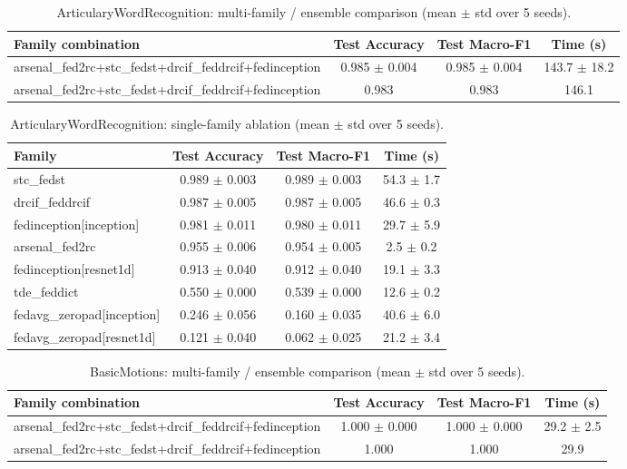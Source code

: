 \begin{table}[t]
\centering
\caption{ArticularyWordRecognition: multi-family / ensemble comparison (mean $\pm$ std over 5 seeds).}
\label{tab:results_articularywordrecognition_ensemble}
\begin{tabular}{lccc}
\toprule
Family combination & Test Accuracy & Test Macro-F1 & Time (s) \\
\midrule
arsenal\_fed2rc+stc\_fedst+drcif\_feddrcif+fedinception & 0.985 $\pm$ 0.004 & 0.985 $\pm$ 0.004 & 143.7 $\pm$ 18.2 \\
arsenal\_fed2rc+stc\_fedst+drcif\_feddrcif+fedinception & 0.983 & 0.983 & 146.1 \\
\bottomrule
\end{tabular}
\end{table}

\begin{table}[t]
\centering
\caption{ArticularyWordRecognition: single-family ablation (mean $\pm$ std over 5 seeds).}
\label{tab:results_articularywordrecognition_ablation}
\begin{tabular}{lccc}
\toprule
Family & Test Accuracy & Test Macro-F1 & Time (s) \\
\midrule
stc\_fedst & 0.989 $\pm$ 0.003 & 0.989 $\pm$ 0.003 & 54.3 $\pm$ 1.7 \\
drcif\_feddrcif & 0.987 $\pm$ 0.005 & 0.987 $\pm$ 0.005 & 46.6 $\pm$ 0.3 \\
fedinception[inception] & 0.981 $\pm$ 0.011 & 0.980 $\pm$ 0.011 & 29.7 $\pm$ 5.9 \\
arsenal\_fed2rc & 0.955 $\pm$ 0.006 & 0.954 $\pm$ 0.005 & 2.5 $\pm$ 0.2 \\
fedinception[resnet1d] & 0.913 $\pm$ 0.040 & 0.912 $\pm$ 0.040 & 19.1 $\pm$ 3.3 \\
tde\_feddict & 0.550 $\pm$ 0.000 & 0.539 $\pm$ 0.000 & 12.6 $\pm$ 0.2 \\
fedavg\_zeropad[inception] & 0.246 $\pm$ 0.056 & 0.160 $\pm$ 0.035 & 40.6 $\pm$ 6.0 \\
fedavg\_zeropad[resnet1d] & 0.121 $\pm$ 0.040 & 0.062 $\pm$ 0.025 & 21.2 $\pm$ 3.4 \\
\bottomrule
\end{tabular}
\end{table}

\begin{table}[t]
\centering
\caption{BasicMotions: multi-family / ensemble comparison (mean $\pm$ std over 5 seeds).}
\label{tab:results_basicmotions_ensemble}
\begin{tabular}{lccc}
\toprule
Family combination & Test Accuracy & Test Macro-F1 & Time (s) \\
\midrule
arsenal\_fed2rc+stc\_fedst+drcif\_feddrcif+fedinception & 1.000 $\pm$ 0.000 & 1.000 $\pm$ 0.000 & 29.2 $\pm$ 2.5 \\
arsenal\_fed2rc+stc\_fedst+drcif\_feddrcif+fedinception & 1.000 & 1.000 & 29.9 \\
\bottomrule
\end{tabular}
\end{table}

